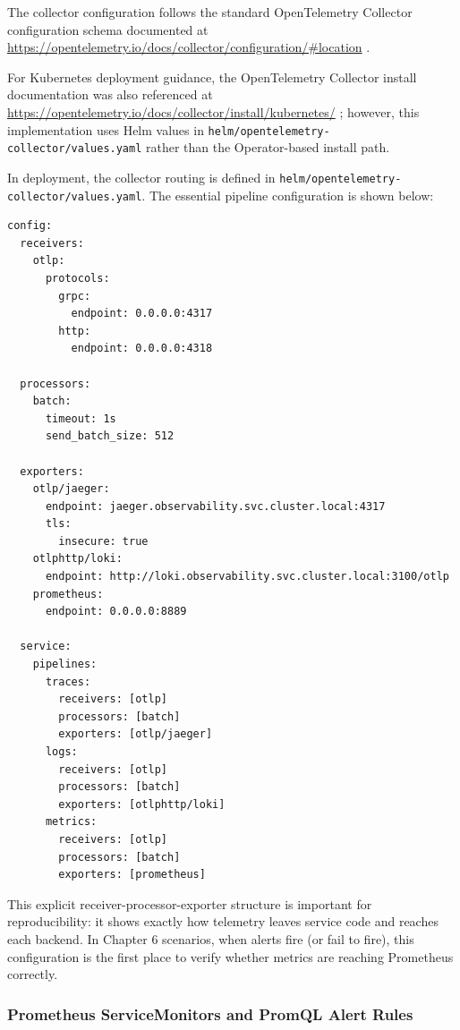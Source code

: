 The collector configuration follows the standard OpenTelemetry Collector configuration schema documented at \url{https://opentelemetry.io/docs/collector/configuration/#location} \cite{opentelemetryCollectorConfigurationLocation}.

For Kubernetes deployment guidance, the OpenTelemetry Collector install documentation was also referenced at \url{https://opentelemetry.io/docs/collector/install/kubernetes/} \cite{opentelemetryCollectorKubernetesInstall}; however, this implementation uses Helm values in \texttt{helm/opentelemetry-collector/values.yaml} rather than the Operator-based install path.

In deployment, the collector routing is defined in \texttt{helm/opentelemetry-collector/values.yaml}. The essential pipeline configuration is shown below:

\begin{verbatim}
config:
  receivers:
    otlp:
      protocols:
        grpc:
          endpoint: 0.0.0.0:4317
        http:
          endpoint: 0.0.0.0:4318

  processors:
    batch:
      timeout: 1s
      send_batch_size: 512

  exporters:
    otlp/jaeger:
      endpoint: jaeger.observability.svc.cluster.local:4317
      tls:
        insecure: true
    otlphttp/loki:
      endpoint: http://loki.observability.svc.cluster.local:3100/otlp
    prometheus:
      endpoint: 0.0.0.0:8889

  service:
    pipelines:
      traces:
        receivers: [otlp]
        processors: [batch]
        exporters: [otlp/jaeger]
      logs:
        receivers: [otlp]
        processors: [batch]
        exporters: [otlphttp/loki]
      metrics:
        receivers: [otlp]
        processors: [batch]
        exporters: [prometheus]
\end{verbatim}

This explicit receiver-processor-exporter structure is important for reproducibility: it shows exactly how telemetry leaves service code and reaches each backend. In Chapter 6 scenarios, when alerts fire (or fail to fire), this configuration is the first place to verify whether metrics are reaching Prometheus correctly.

\subsubsection{Prometheus ServiceMonitors and PromQL Alert Rules}


